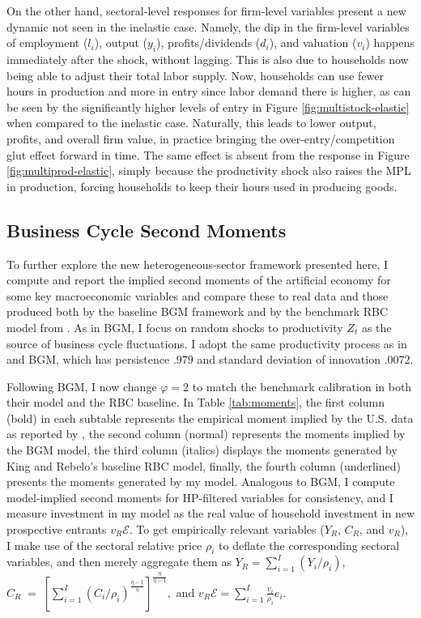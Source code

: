 \documentclass[a4paper,12pt]{article} %
\numberwithin{equation}{section} %
\numberwithin{figure}{section}
\numberwithin{table}{section}
\begin{document}
On the other hand, sectoral-level responses for firm-level variables present a new dynamic not seen in the inelastic case. Namely, the dip in the
firm-level variables of employment ($l_i$), output ($y_i$), profits/dividends ($d_i$), and valuation ($v_i$) happens immediately after the shock,
without lagging. This is also due to households now being able to adjust their total labor supply. Now, households can use fewer hours in production
and more in entry since labor demand there is higher, as can be seen by the significantly higher levels of entry in Figure \ref{fig:multistock-elastic}
when compared to the inelastic case. Naturally, this leads to lower output, profits, and overall firm value, in practice bringing the 
over-entry/competition glut effect forward in time. The same effect is absent from the response in Figure \ref{fig:multiprod-elastic}, simply because
the productivity shock also raises the MPL in production, forcing households to keep their hours used in producing goods. 


\subsection{Business Cycle Second Moments}
\label{sec:quant-BCmon}

To further explore the new heterogeneous-sector framework presented here, I compute and report the implied second
moments of the artificial economy for some key macroeconomic variables and compare these to real data and those produced
both by the baseline BGM framework and by the benchmark RBC model from \textcite{king1999resuscitating}. As in BGM,
I focus on random shocks to productivity $Z_t$ as the source of business cycle fluctuations. I adopt the same
productivity process as in \textcite{king1999resuscitating} and BGM, which has persistence $.979$ and standard deviation
of innovation $.0072$.

Following BGM, I now change $\varphi = 2$ to match the benchmark calibration in both their model and
the RBC baseline. In Table \ref{tab:moments}, the first column (bold) in each subtable represents the empirical
moment implied by the U.S. data as reported by \textcite{king1999resuscitating}, the second column (normal) 
represents the moments implied by the BGM model, the third column (italics) displays the moments
generated by King and Rebelo’s baseline RBC model, finally, the fourth column (underlined) presents the moments
generated by my model. Analogous to BGM, I compute model-implied second moments for HP-filtered 
variables for consistency, and I measure investment in my model 
as the real value of household investment in new prospective entrants $v_R \mathcal{E}$. To get empirically relevant
variables ($Y_R$, $C_R$, and $v_R$), I make use of the sectoral relative price $\rho_i$ to deflate the corresponding sectoral variables,
and then merely aggregate them as $Y_R = \sum_{i=1}^I(Y_i/\rho_i)$, $C_R\;=\; 
\left[ \sum_{i=1}^I \left( C_{i}/\rho_i \right)^{\frac{\eta-1}{\eta}} \right]^{\frac{\eta}{\eta-1}},$ 
and $v_R\mathcal{E}=\sum_{i=1}^I\frac{v_{i}}{\rho_i}e_{i}$. 
\end{document}
